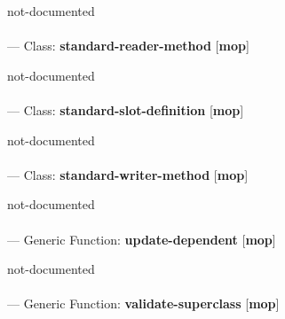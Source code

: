 \begin{adjustwidth}{5em}{5em}
not-documented
\end{adjustwidth}

\paragraph{}
\label{MOP:STANDARD-READER-METHOD}
--- Class: \textbf{standard-reader-method} [\textbf{mop}] \textit{}

\begin{adjustwidth}{5em}{5em}
not-documented
\end{adjustwidth}

\paragraph{}
\label{MOP:STANDARD-SLOT-DEFINITION}
--- Class: \textbf{standard-slot-definition} [\textbf{mop}] \textit{}

\begin{adjustwidth}{5em}{5em}
not-documented
\end{adjustwidth}

\paragraph{}
\label{MOP:STANDARD-WRITER-METHOD}
--- Class: \textbf{standard-writer-method} [\textbf{mop}] \textit{}

\begin{adjustwidth}{5em}{5em}
not-documented
\end{adjustwidth}

\paragraph{}
\label{MOP:UPDATE-DEPENDENT}
--- Generic Function: \textbf{update-dependent} [\textbf{mop}] \textit{}

\begin{adjustwidth}{5em}{5em}
not-documented
\end{adjustwidth}

\paragraph{}
\label{MOP:VALIDATE-SUPERCLASS}
--- Generic Function: \textbf{validate-superclass} [\textbf{mop}] \textit{}


